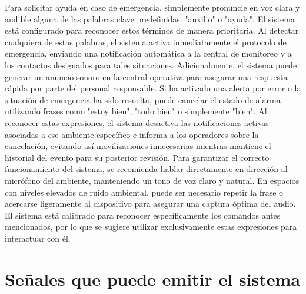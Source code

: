 Para solicitar ayuda en caso de emergencia, simplemente pronuncie en voz clara y audible alguna de las palabras clave predefinidas: "auxilio" o "ayuda". El sistema está configurado para reconocer estos términos de manera prioritaria. Al detectar cualquiera de estas palabras, el sistema activa inmediatamente el protocolo de emergencia, enviando una notificación automática a la central de monitoreo y a los contactos designados para tales situaciones. Adicionalmente, el sistema puede generar un anuncio sonoro en la central operativa para asegurar una respuesta rápida por parte del personal responsable. Si ha activado una alerta por error o la situación de emergencia ha sido resuelta, puede cancelar el estado de alarma utilizando frases como "estoy bien", "todo bien" o simplemente "bien". Al reconocer estas expresiones, el sistema desactiva las notificaciones activas asociadas a ese ambiente específico e informa a los operadores sobre la cancelación, evitando así movilizaciones innecesarias mientras mantiene el historial del evento para su posterior revisión. Para garantizar el correcto funcionamiento del sistema, se recomienda hablar directamente en dirección al micrófono del ambiente, manteniendo un tono de voz claro y natural. En espacios con niveles elevados de ruido ambiental, puede ser necesario repetir la frase o acercarse ligeramente al dispositivo para asegurar una captura óptima del audio. El sistema está calibrado para reconocer específicamente los comandos antes mencionados, por lo que se sugiere utilizar exclusivamente estas expresiones para interactuar con él.

\section*{Señales que puede emitir el sistema}

